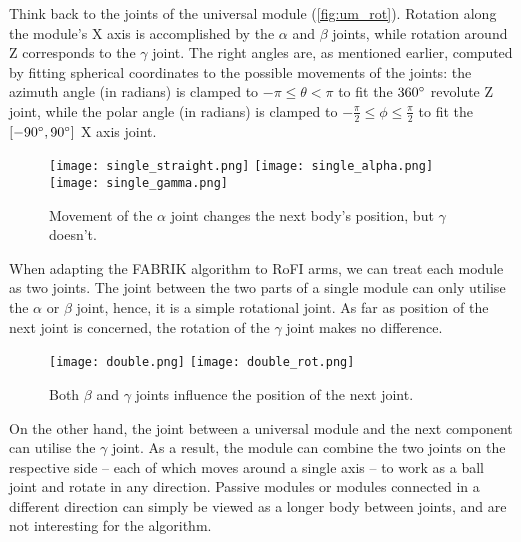 Think back to the joints of the universal module (\ref{fig:um_rot}). Rotation along the module's X axis is accomplished by the $\alpha$ and $\beta$ joints, while rotation around Z corresponds to the $\gamma$ joint. The right angles are, as mentioned earlier, computed by fitting spherical coordinates to the possible movements of the joints: the azimuth angle (in radians) is clamped to $-\pi \le \theta < \pi$ to fit the $360\degree$ revolute Z joint, while the polar angle (in radians) is clamped to $-\frac{\pi}{2} \le \phi \le \frac{\pi}{2}$ to fit the $\left[-90\degree, 90\degree\right]$ X axis joint.

\begin{wrapfigure}{r}{0.5\textwidth}
  \centering
  \begin{minipage}{0.5\textwidth}
    \texttt{[image: single\_straight.png]}
    \texttt{[image: single\_alpha.png]}
    \texttt{[image: single\_gamma.png]}
  \end{minipage}
  \caption{Movement of the $\alpha$ joint changes the next body's position, but $\gamma$ doesn't.}
\end{wrapfigure}

When adapting the FABRIK algorithm to RoFI arms, we can treat each module as two joints. The joint between the two parts of a single module can only utilise the $\alpha$ or $\beta$ joint, hence, it is a simple rotational joint. As far as position of the next joint is concerned, the rotation of the $\gamma$ joint makes no difference.

\begin{wrapfigure}{l}{0.4\textwidth}
  \centering
  \begin{minipage}{0.4\textwidth}
    \texttt{[image: double.png]}
    \texttt{[image: double\_rot.png]}
  \end{minipage}
  \caption{Both $\beta$ and $\gamma$ joints influence the position of the next joint.}
\end{wrapfigure}

On the other hand, the joint between a universal module and the next component can utilise the $\gamma$ joint. As a result, the module can combine the two joints on the respective side -- each of which moves around a single axis -- to work as a ball joint and rotate in any direction. Passive modules or modules connected in a different direction can simply be viewed as a longer body between joints, and are not interesting for the algorithm.

